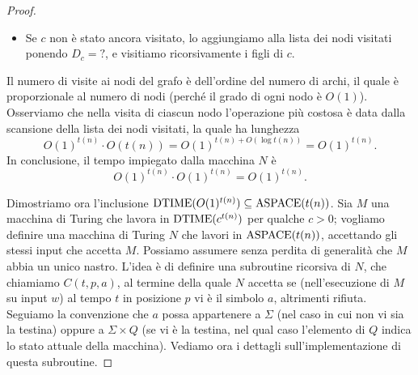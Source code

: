 \begin{proof}
\begin{itemize}
    \item Se $c$ non è stato ancora visitato, lo aggiungiamo alla lista dei nodi visitati ponendo $D_c=\texttt{?}$, e visitiamo ricorsivamente i figli di $c$.
  \end{itemize}

  Il numero di visite ai nodi del grafo è dell'ordine del numero di archi, il quale è proporzionale al numero di nodi (perché il grado di ogni nodo è $O(1)$).
  Osserviamo che nella visita di ciascun nodo l'operazione più costosa è data dalla scansione della lista dei nodi visitati, la quale ha lunghezza
  \[ O(1)^{t(n)} \cdot O(t(n)) = O(1)^{ t(n) + O(\log t(n)) } = O(1)^{t(n)}. \]
  In conclusione, il tempo impiegato dalla macchina $N$ è
  \[ O(1)^{t(n)} \cdot O(1)^{t(n)} = O(1)^{t(n)}. \]
  
  Dimostriamo ora l'inclusione $\operatorname{DTIME}(O(1)^{t(n)}) \subseteq \operatorname{ASPACE}(t(n))$.
  Sia $M$ una macchina di Turing che lavora in $\operatorname{DTIME}(c^{t(n)})$ per qualche $c>0$; vogliamo definire una macchina di Turing $N$ che lavori in $\operatorname{ASPACE}(t(n))$, accettando gli stessi input che accetta $M$.
  Possiamo assumere senza perdita di generalità che $M$ abbia un unico nastro.
  L'idea è di definire una subroutine ricorsiva di $N$, che chiamiamo $C(t,p,a)$, al termine della quale $N$ accetta se (nell'esecuzione di $M$ su input $w$) al tempo $t$ in posizione $p$ vi è il simbolo $a$, altrimenti rifiuta.
  Seguiamo la convenzione che $a$ possa appartenere a $\Sigma$ (nel caso in cui non vi sia la testina) oppure a $\Sigma\times Q$ (se vi è la testina, nel qual caso l'elemento di $Q$ indica lo stato attuale della macchina). Vediamo ora i dettagli sull'implementazione di questa subroutine.
  

\end{proof}
